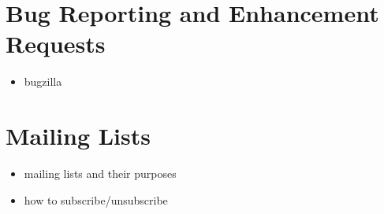 \section{Bug Reporting and Enhancement Requests}
\begin{itemize}
\item bugzilla
\end{itemize}

\section{Mailing Lists}
\begin{itemize}
\item mailing lists and their purposes
\item how to subscribe/unsubscribe
\end{itemize}
